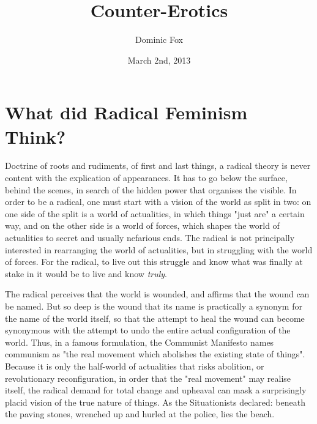 \documentclass[ebook]{memoir}
\title{Counter-Erotics}
\author{Dominic Fox}
\date{March 2nd, 2013}
\begin{document}
\maketitle

\chapter{What did Radical Feminism Think?}

Doctrine of roots and rudiments, of first and last things, a radical theory is never content with the explication of appearances. It has to go below the surface, behind the scenes, in search of the hidden power that organises the visible. In order to be a radical, one must start with a vision of the world as split in two: on one side of the split is a world of actualities, in which things "just are" a certain way, and on the other side is a world of forces, which shapes the world of actualities to secret and usually nefarious ends. The radical is not principally interested in rearranging the world of actualities, but in struggling with the world of forces. For the radical, to live out this struggle and know what was finally at stake in it would be to live and know \emph{truly}.

The radical perceives that the world is wounded, and affirms that the wound can be named. But so deep is the wound that its name is practically a synonym for the name of the world itself, so that the attempt to heal the wound can become synonymous with the attempt to undo the entire actual configuration of the world. Thus, in a famous formulation, the Communist Manifesto names communism as "the real movement which abolishes the existing state of things". Because it is only the half-world of actualities that risks abolition, or revolutionary reconfiguration, in order that the "real movement" may realise itself, the radical demand for total change and upheaval can mask a surprisingly placid vision of the true nature of things. As the Situationists declared: beneath the paving stones, wrenched up and hurled at the police, lies the beach.
\end{document}
